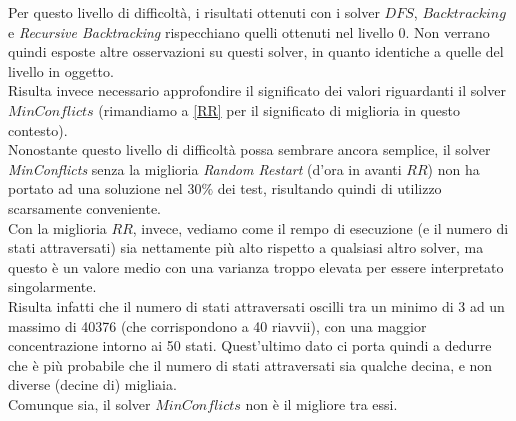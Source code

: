 Per questo livello di difficoltà, i risultati ottenuti con i solver $DFS$, $Backtracking$ e \textit{Recursive Backtracking} rispecchiano quelli ottenuti nel livello 0. Non verrano quindi esposte altre osservazioni su questi solver, in quanto identiche a quelle del livello in oggetto.\\


Risulta invece necessario approfondire il significato dei valori riguardanti il solver $MinConflicts$ (rimandiamo a \ref{RR} per il significato di miglioria in questo contesto).\\
Nonostante questo livello di difficoltà possa sembrare ancora semplice, il solver \textit{MinConflicts} senza la miglioria \textit{Random Restart} (d'ora in avanti $RR$) non ha portato ad una soluzione nel $30\%$ dei test, risultando quindi di utilizzo scarsamente conveniente. \\
Con la miglioria $RR$, invece, vediamo come il rempo di esecuzione (e il numero di stati attraversati) sia nettamente più alto rispetto a qualsiasi altro solver, ma questo è un valore medio con una varianza troppo elevata per essere interpretato singolarmente. \\Risulta infatti che il numero di stati attraversati oscilli tra un minimo di 3 ad un massimo di 40376 (che corrispondono a 40 riavvii), con una maggior concentrazione intorno ai 50 stati. Quest'ultimo dato ci porta quindi a dedurre che è più probabile che il numero di stati attraversati sia qualche decina, e non diverse (decine di) migliaia.\\
Comunque sia, il solver $MinConflicts$ non è il migliore tra essi.


